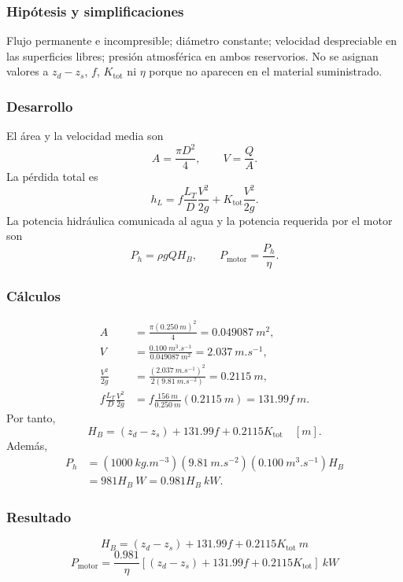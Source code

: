 \documentclass[12pt]{article}
\newcommand{\resultado}[1]{\[
  \boxed{\displaystyle #1}
\]}
\begin{document}
\subsubsection*{Hipótesis y simplificaciones}
Flujo permanente e incompresible; diámetro constante; velocidad despreciable en las
superficies libres; presión atmosférica en ambos reservorios. No se asignan valores a
$z_d-z_s$, $f$, $K_{\mathrm{tot}}$ ni $\eta$ porque no aparecen en el material suministrado.

\subsubsection*{Desarrollo}
El área y la velocidad media son
\[
A=\frac{\pi D^2}{4},\qquad V=\frac{Q}{A}.
\]
La pérdida total es
\[
h_L=f\frac{L_T}{D}\frac{V^2}{2g}
   +K_{\mathrm{tot}}\frac{V^2}{2g}.
\]
La potencia hidráulica comunicada al agua y la potencia requerida por el motor son
\[
P_h=\rho gQH_B,\qquad P_{\mathrm{motor}}=\frac{P_h}{\eta}.
\]

\subsubsection*{Cálculos}
\begin{align*}
A&=\frac{\pi(\SI{0.250}{m})^2}{4}=\SI{0.049087}{m^2},\\
V&=\frac{\SI{0.100}{m^3.s^{-1}}}{\SI{0.049087}{m^2}}
  =\SI{2.037}{m.s^{-1}},\\
\frac{V^2}{2g}&=\frac{(\SI{2.037}{m.s^{-1}})^2}
 {2(\SI{9.81}{m.s^{-2}})}=\SI{0.2115}{m},\\
f\frac{L_T}{D}\frac{V^2}{2g}
&=f\frac{\SI{156}{m}}{\SI{0.250}{m}}(\SI{0.2115}{m})
=131.99f\ \si{m}.
\end{align*}
Por tanto,
\[
H_B=(z_d-z_s)+131.99f+0.2115K_{\mathrm{tot}}\quad [\si{m}].
\]
Además,
\begin{align*}
P_h&=(\SI{1000}{kg.m^{-3}})(\SI{9.81}{m.s^{-2}})
(\SI{0.100}{m^3.s^{-1}})H_B\\
&=981H_B\ \si{W}=0.981H_B\ \si{kW}.
\end{align*}

\subsubsection*{Resultado}
\resultado{H_B=(z_d-z_s)+131.99f+0.2115K_{\mathrm{tot}}\ \si{m}}
\resultado{P_{\mathrm{motor}}=\frac{0.981}{\eta}
\left[(z_d-z_s)+131.99f+0.2115K_{\mathrm{tot}}\right]\ \si{kW}}
\end{document}
